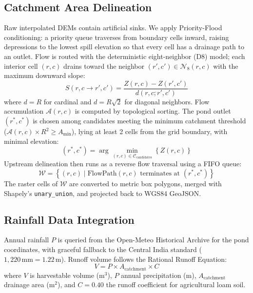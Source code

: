\documentclass[manuscript,screen,review]{acmart}
\begin{document}
\subsection{Catchment Area Delineation}
Raw interpolated DEMs contain artificial sinks. We apply Priority-Flood conditioning: a priority queue traverses from boundary cells inward, raising depressions to the lowest spill elevation so that every cell has a drainage path to an outlet. Flow is routed with the deterministic eight-neighbor (D8) model; each interior cell $(r, c)$ drains toward the neighbor $(r', c') \in \mathcal{N}_8(r, c)$ with the maximum downward slope:
\begin{equation}
    S(r, c \rightarrow r', c') = \frac{Z(r, c) - Z(r', c')}{d(r, c; r', c')}
\end{equation}
where $d = R$ for cardinal and $d = R\sqrt{2}$ for diagonal neighbors. Flow accumulation $\mathcal{A}(r, c)$ is computed by topological sorting. The pond outlet $(r^*, c^*)$ is chosen among candidates meeting the minimum catchment threshold ($\mathcal{A}(r, c) \times R^2 \ge A_{\min}$), lying at least 2 cells from the grid boundary, with minimal elevation:
\begin{equation}
    (r^*, c^*) = \arg\min_{(r, c) \in \mathcal{C}_{\text{candidates}}} \left\{ Z(r, c) \right\}
\end{equation}
Upstream delineation then runs as a reverse flow traversal using a FIFO queue:
\begin{equation}
    \mathcal{W} = \left\{ (r, c) \mid \text{FlowPath}(r, c) \text{ terminates at } (r^*, c^*) \right\}
\end{equation}
The raster cells of $\mathcal{W}$ are converted to metric box polygons, merged with Shapely's \texttt{unary\_union}, and projected back to WGS84 GeoJSON.

\subsection{Rainfall Data Integration}
Annual rainfall $P$ is queried from the Open-Meteo Historical Archive for the pond coordinates, with graceful fallback to the Central India standard ($1,220\,\text{mm} = 1.22\,\text{m}$). Runoff volume follows the Rational Runoff Equation:
\begin{equation}
    V = P \times A_{\text{catchment}} \times C
\end{equation}
where $V$ is harvestable volume ($\text{m}^3$), $P$ annual precipitation (m), $A_{\text{catchment}}$ drainage area ($\text{m}^2$), and $C = 0.40$ the runoff coefficient for agricultural loam soil.
\end{document}
